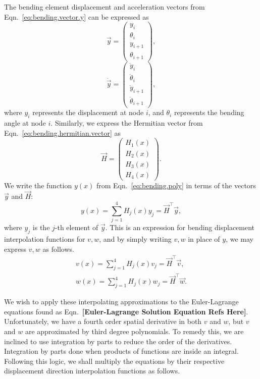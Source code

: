 The bending element displacement and acceleration vectors from Eqn.~\ref{eq:bending.vector.y} can be expressed as
\begin{equation}
\vec y = 
\begin{pmatrix}
y_i \\
\theta_i \\
y_{i+1} \\
\theta_{i+1}
\end{pmatrix},
\end{equation}
\begin{equation}
\ddot{\vec y} = 
\begin{pmatrix}
\ddot y_i \\
\ddot\theta_i \\
\ddot y_{i+1} \\
\ddot\theta_{i+1}
\end{pmatrix},
\end{equation}
where $y_i$ represents the displacement at node $i$, and $\theta_i$ represents the bending angle at node $i$. Similarly, we express the Hermitian vector from Eqn.~\ref{eq:bending.hermitian.vector} as
\begin{equation}
\vec{H} = 
\begin{pmatrix}
H_1(x) \\
H_2(x) \\
H_3(x) \\
H_4(x)
\end{pmatrix}.
\end{equation}
We write the function $y(x)$ from Eqn.~\ref{eq:bending.poly} in terms of the vectors $\vec{y}$ and $\vec H$:
\begin{equation}
y(x) = \sum_{j=1}^4 H_j(x)y_j = \vec{H}^\top \vec{y},
\end{equation}
where $y_j$ is the $j$-th element of $\vec{y}$. This is an expression for bending displacement interpolation functions for $v,w$, and by simply writing $v,w$ in place of $y$, we may express $v,w$ as follows.
\begin{eqnarray}
v(x) = \sum_{j=1}^4 H_j(x)v_j = \vec{H}^\top \vec{v}, \\
w(x) = \sum_{j=1}^4 H_j(x)w_j = \vec{H}^\top \vec{w}.
\end{eqnarray}

We wish to apply these interpolating approximations to the Euler-Lagrange equations found as Eqn.~\textbf{[Euler-Lagrange Solution Equation Refs Here]}. Unfortunately, we have a fourth order spatial derivative in both $v$ and $w$, but $v$ and $w$ are approximated by third degree polynomials. To remedy this, we are inclined to use integration by parts to reduce the order of the derivatives. Integration by parts done when products of functions are inside an integral. Following this logic, we shall multiply the equations by their respective displacement direction interpolation functions as follows.

